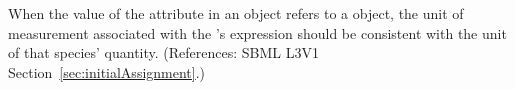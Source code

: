 When the value of the attribute  in an \InitialAssignment
object refers to a \Species object, the unit of measurement associated with
the \InitialAssignment's  expression should be consistent with
the unit of that species' quantity.  (References: SBML L3V1
Section~\ref{sec:initialAssignment}.)
